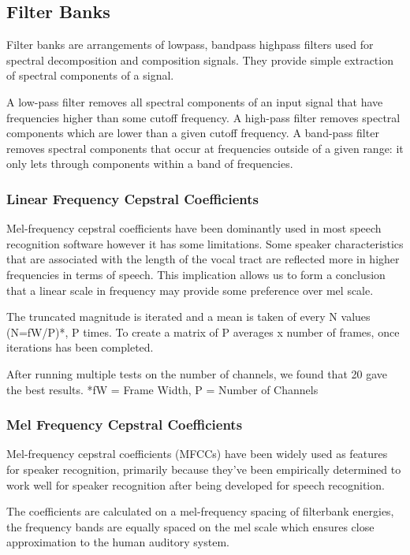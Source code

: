 \documentclass[	DIV=calc,%
							paper=a4,%
							fontsize=9.8pt,%
							twocolumn]{scrartcl}	 					%
\begin{document}
\subsection{Filter Banks}
Filter banks are arrangements of lowpass, bandpass highpass filters used for spectral decomposition and composition signals. They provide simple extraction of spectral components of a signal.
 
A low-pass filter removes all spectral components of an input signal that have frequencies higher than some cutoff frequency. A high-pass filter removes spectral components which are lower than a given cutoff frequency. A band-pass filter removes spectral components that occur at frequencies outside of a given range: it only lets through components within a band of frequencies.

\subsubsection{Linear Frequency Cepstral Coefficients}
Mel-frequency cepstral coefficients have been dominantly used in most speech recognition software however it has some limitations. Some speaker characteristics that are associated with the length of the vocal tract are reflected more in higher frequencies in terms of speech. This implication allows us to form a conclusion that a linear scale in frequency may provide some preference over mel scale.

The truncated magnitude is iterated and a mean is taken of every N values (N=fW/P)*, P times. To create a matrix of P averages x number of frames, once iterations has been completed.

After running multiple tests on the number of channels, we found that 20 gave the best results.
*fW = Frame Width, P = Number of Channels
\subsubsection{Mel Frequency Cepstral Coefficients}
Mel-frequency cepstral coefficients (MFCCs) have been widely used as features for speaker recognition, primarily because they’ve been empirically determined to work well for speaker recognition after being developed for speech recognition. \cite{DBLP:conf/interspeech/LeiL09}

The coefficients are calculated on a mel-frequency spacing of filterbank energies, the frequency bands are equally spaced on the mel scale which ensures close approximation to the human auditory system.
\end{document}

